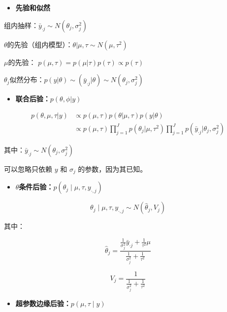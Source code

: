 \begin{itemize}
\item
  \textbf{先验和似然}
\end{itemize}

组内抽样：\(\bar y_{\cdot j} \sim N(\theta_j,\sigma^2_j)\)

\(\theta\)的先验（组内模型）：\(\theta|\mu,\tau \sim N(\mu,\tau^2)\)

\(\mu\)的先验： \(p(\mu,\tau)=p(\mu|\tau)p(\tau)\propto p(\tau)\)

\(\theta_j\)似然分布：\(p(y|\theta)\sim(\bar y_{\cdot j}|\theta) \sim N(\theta_j,\sigma^2_j)\)

\begin{itemize}
\item
  \textbf{联合后验：}\(p(\theta,\phi|y)\)
\end{itemize}

\begin{equation}
  \begin{aligned}
    p(\theta,\mu,\tau|y)
    &\propto p(\mu,\tau)p(\theta|\mu,\tau)p(y|\theta)\\
    &\propto p(\mu,\tau)\prod_{j=1}^{J}p(\theta_j|\mu,\tau^2)
    \prod_{j=1}^{J}p(\bar y _{\cdot j}|\theta_j,\sigma^2_j)
    \end{aligned}
\end{equation}


其中：\(\bar y _{\cdot j}\sim N(\theta_j,\sigma_j^2)\)

可以忽略只依赖 \(y\) 和 \(\sigma_j\) 的参数，因为其已知。

\begin{itemize}
\item
  \textbf{\(\theta\)条件后验：}\(p(\theta_{j} \mid \mu, \tau, y_{\cdot, j})\)
\end{itemize}

\[\theta_{j} \mid \mu, \tau, y_{\cdot, j} \sim N\left(\hat{\theta}_{j}, V_{j}\right)\]

其中：

\[\hat{\theta}_{j}=
\frac
{\frac{1}{\sigma_{j}^{2}} \bar{y}_{\cdot j}+
\frac{1}{\tau^{2}} \mu}
{\frac{1}{\sigma_{j}^{2}}+\frac{1}{\tau^{2}}}\]

\[V_{j}=\frac{1}{\frac{1}{\sigma_{j}^{2}}+\frac{1}{\tau^{2}}}\]

\begin{itemize}
\item
  \textbf{超参数边缘后验：}\(p(\mu, \tau \mid y)\)
\end{itemize}

